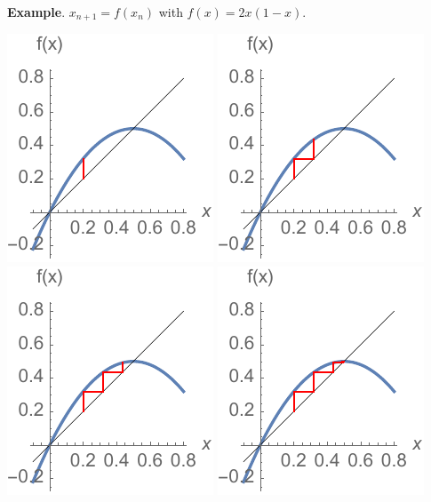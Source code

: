 \documentclass[12pt,letterpaper,noanswers]{exam}
\begin{document}
\noindent\textbf{Example}.  $x_{n+1} = f(x_n)$ with $f(x) = 2x(1-x)$.  

\includegraphics{img/C04mapsp1.pdf}
\includegraphics{img/C04mapsp1b.pdf}
\includegraphics{img/C04mapsp1c.pdf}
\includegraphics{img/C04mapsp1d.pdf}
\end{document}
